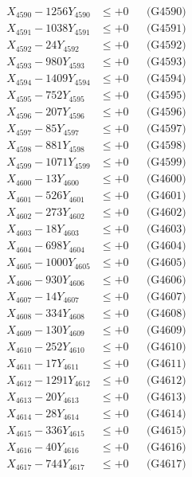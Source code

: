 \documentclass[a4paper,10pt]{article}
\begin{document}
{\begin{align}
X_{4590} - 1256Y_{4590} &\leq +0 && \text{(G4590)} \\
\allowbreak
X_{4591} - 1038Y_{4591} &\leq +0 && \text{(G4591)} \\
X_{4592} - 24Y_{4592} &\leq +0 && \text{(G4592)} \\
X_{4593} - 980Y_{4593} &\leq +0 && \text{(G4593)} \\
X_{4594} - 1409Y_{4594} &\leq +0 && \text{(G4594)} \\
X_{4595} - 752Y_{4595} &\leq +0 && \text{(G4595)} \\
X_{4596} - 207Y_{4596} &\leq +0 && \text{(G4596)} \\
X_{4597} - 85Y_{4597} &\leq +0 && \text{(G4597)} \\
X_{4598} - 881Y_{4598} &\leq +0 && \text{(G4598)} \\
X_{4599} - 1071Y_{4599} &\leq +0 && \text{(G4599)} \\
X_{4600} - 13Y_{4600} &\leq +0 && \text{(G4600)} \\
\allowbreak
X_{4601} - 526Y_{4601} &\leq +0 && \text{(G4601)} \\
X_{4602} - 273Y_{4602} &\leq +0 && \text{(G4602)} \\
X_{4603} - 18Y_{4603} &\leq +0 && \text{(G4603)} \\
X_{4604} - 698Y_{4604} &\leq +0 && \text{(G4604)} \\
X_{4605} - 1000Y_{4605} &\leq +0 && \text{(G4605)} \\
X_{4606} - 930Y_{4606} &\leq +0 && \text{(G4606)} \\
X_{4607} - 14Y_{4607} &\leq +0 && \text{(G4607)} \\
X_{4608} - 334Y_{4608} &\leq +0 && \text{(G4608)} \\
X_{4609} - 130Y_{4609} &\leq +0 && \text{(G4609)} \\
X_{4610} - 252Y_{4610} &\leq +0 && \text{(G4610)} \\
\allowbreak
X_{4611} - 17Y_{4611} &\leq +0 && \text{(G4611)} \\
X_{4612} - 1291Y_{4612} &\leq +0 && \text{(G4612)} \\
X_{4613} - 20Y_{4613} &\leq +0 && \text{(G4613)} \\
X_{4614} - 28Y_{4614} &\leq +0 && \text{(G4614)} \\
X_{4615} - 336Y_{4615} &\leq +0 && \text{(G4615)} \\
X_{4616} - 40Y_{4616} &\leq +0 && \text{(G4616)} \\
X_{4617} - 744Y_{4617} &\leq +0 && \text{(G4617)} \\

\end{align}}
\end{document}
